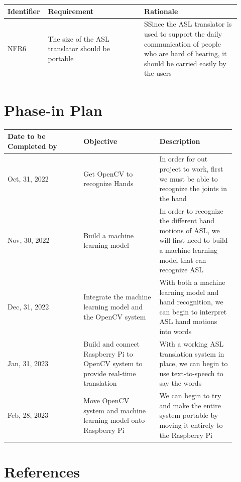 \documentclass[12pt]{article}
\begin{document}
\renewcommand{\arraystretch}{1.2}
\noindent \begin{tabularx}{\textwidth}{p{0.12\linewidth}|p{0.4\linewidth}|p{0.4\linewidth}}
\toprule
\textbf{Identifier} & \textbf{Requirement} & \textbf{Rationale}\\
\midrule
NFR6
& The size of the ASL translator should be portable
& SSince the ASL translator is used to support the daily communication of people who are hard of hearing, it should be carried easily by the users\\
\bottomrule
\end{tabularx}

\section{Phase-in Plan}

\renewcommand{\arraystretch}{1.2}
\noindent \begin{tabularx}{\textwidth}{p{0.3\linewidth}|p{0.3\linewidth}|p{0.3\linewidth}}
\toprule
\textbf{Date to be Completed by} & \textbf{Objective} & \textbf{Description}\\
\midrule
Oct, 31, 2022
& Get OpenCV to recognize Hands
& In order for out project to work, first we 
must be able to recognize the joints in the hand\\
\hline
Nov, 30, 2022
& Build a machine learning model
& In order to recognize the different hand motions
of ASL, we will first need to build a machine learning
model that can recognize ASL\\
\hline
Dec, 31, 2022
& Integrate the machine learning model and the OpenCV 
system
& With both a machine learning model and hand recognition,
we can begin to interpret ASL hand motions into words\\
\hline
Jan, 31, 2023
& Build and connect Raspberry Pi to OpenCV system to 
provide real-time translation
& With a working ASL translation system in place, we 
can begin to use text-to-speech to say the words\\
\hline
Feb, 28, 2023
& Move OpenCV system and machine learning model onto 
Raspberry Pi
& We can begin to try and make the entire system portable 
by moving it entirely to the Raspberry Pi\\
\bottomrule
\end{tabularx}

\newpage
\section{References}
\end{document}
